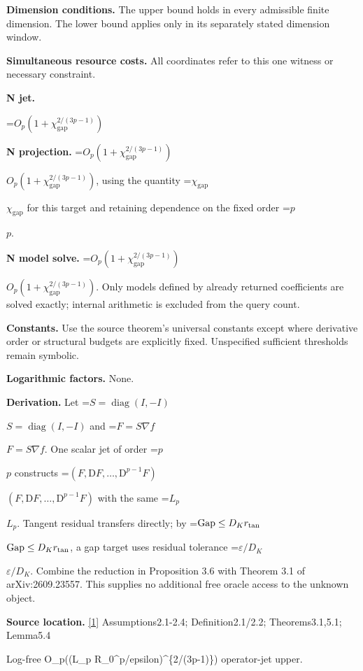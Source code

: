 \documentclass[10pt,a4paper]{article}
\newcommand{\AtlasMath}[1]{\par\begingroup\centering\setbox0=\hbox{$\displaystyle #1$}\ifdim\wd0>1.4\linewidth\typeout{ATLAS WIDE FORMULA: \the\wd0}\fi\ifdim\wd0>\linewidth\resizebox{\linewidth}{!}{\box0}\else\box0\fi\par\endgroup}
\newcommand{\AtlasInlineMath}[1]{\begingroup\setbox0=\hbox{$#1$}\ifdim\wd0>.4\linewidth\endgroup\AtlasMath{#1}\else\endgroup$#1$\fi}
\begin{document}
\textbf{Dimension conditions.} The upper bound holds in every admissible finite dimension. The lower bound applies only in its separately stated dimension window.



\textbf{Simultaneous resource costs.} All coordinates refer to this one witness or necessary constraint.



\textbf{N jet.}



\AtlasMath{O_p(1+\chi_{\mathrm{gap}}^{2/(3p-1)})}


\textbf{N projection.} \AtlasInlineMath{O_p\!\left(1+\chi_{\mathrm{gap}}^{2/(3p-1)}\right)}, using the quantity \AtlasInlineMath{\chi_{\mathrm{gap}}} for this target and retaining dependence on the fixed order \AtlasInlineMath{p}.



\textbf{N model solve.} \AtlasInlineMath{O_p\!\left(1+\chi_{\mathrm{gap}}^{2/(3p-1)}\right)}. Only models defined by already returned coefficients are solved exactly; internal arithmetic is excluded from the query count.



\textbf{Constants.} Use the source theorem’s universal constants except where derivative order or structural budgets are explicitly fixed. Unspecified sufficient thresholds remain symbolic.



\textbf{Logarithmic factors.} None.



\textbf{Derivation.} Let \AtlasInlineMath{S=\operatorname{diag}(I,-I)} and \AtlasInlineMath{F=S\nabla f}. One scalar jet of order \AtlasInlineMath{p} constructs \AtlasInlineMath{(F,\mathrm DF,\ldots,\mathrm D^{p-1}F)} with the same \AtlasInlineMath{L_p}. Tangent residual transfers directly; by \AtlasInlineMath{\operatorname{Gap}\le D_K r_{\rm tan}}, a gap target uses residual tolerance \AtlasInlineMath{\varepsilon/D_K}. Combine the reduction in Proposition 3.6 with Theorem 3.1 of arXiv:2609.23557. This supplies no additional free oracle access to the unknown object.



\textbf{Source location.} \href{https://arxiv.org/pdf/2609.23557v1}{[1]} Assumptions2.1-2.4; Definition2.1/2.2; Theorems3.1,5.1; Lemma5.4



Log-free O\_p((L\_p R\_0\textasciicircum{}p/epsilon)\textasciicircum{}\{2/(3p-1)\}) operator-jet upper.
\end{document}

